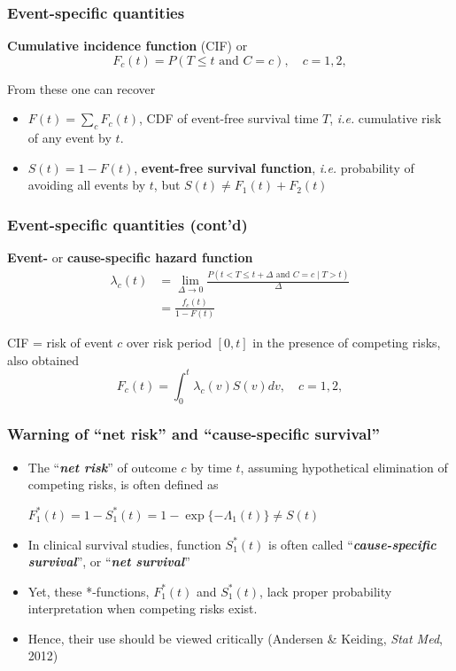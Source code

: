 \documentclass[handout,12pt,dvipsnames,t]{beamer}
\begin{document}
\begin{frame}[fragile]
\frametitle{Event-specific quantities}

\textbf{Cumulative incidence function} (CIF) or \\
\[  F_c(t) = P(T \leq t \text{ and } C = c ), \quad c = 1,2,  \]

\medskip
From these one can recover
\begin{itemize}
\item
$F(t) = \sum_{c} F_c(t)$, CDF of event-free survival time $T$, \textit{i.e.} 
cumulative risk of any event by $t$.
\medskip
\item
$S(t) = 1 - F(t)$, \textbf{event-free survival function}, \textit{i.e.} probability of avoiding all events by $t$, but $S(t) \ne F_1(t)+F_2(t)$
\end{itemize}
\end{frame}


\begin{frame}[fragile]
\frametitle{Event-specific quantities (cont'd)}

\textbf{Event-} or \textbf{cause-specific hazard function}
\begin{align*}
 \lambda_c(t) & =  \underset{\Delta\to 0}{\lim} 
    \frac{P(t < T \le t+\Delta \text{ and } C = c \mid T > t)}{\Delta}  \\
        & =  \frac{f_c(t)}{1-F(t)}
\end{align*}

CIF   =  risk of event $c$ over risk period $[0,t]$ in the presence of competing risks, also obtained 
$$ F_c(t) = \int_0^t \lambda_c(v) S(v) dv, \quad c = 1,2, $$
\end{frame}

\begin{frame}
\frametitle{Warning of ``net risk'' and ``cause-specific survival''}

\begin{itemize}                              
\item
The ``\textbf{\textit{net risk}}'' of outcome $c$ by time $t$, 
assuming hypothetical elimination of competing risks,
is often defined as
\begin{center}
$ F_1^*(t) = 1 - S_1^*(t) = 1- \exp\{ - \Lambda_1(t) \} \ne S(t) $
\end{center}
\medskip
\item
In clinical survival studies, function 
$S_1^*(t)$ is often called ``\textbf{\textit{cause-specific survival}}'',
or ``\textbf{\textit{net survival}}''
\medskip
\item
Yet, these *-functions, $ F_1^*(t)$ and $S_1^*(t)$, lack proper probability interpretation when
 competing risks exist.
\medskip
\item
Hence, their use 
should be viewed critically
(Andersen \& Keiding, \textit{Stat Med}, 2012)
\end{itemize}
\end{frame}
\end{document}
